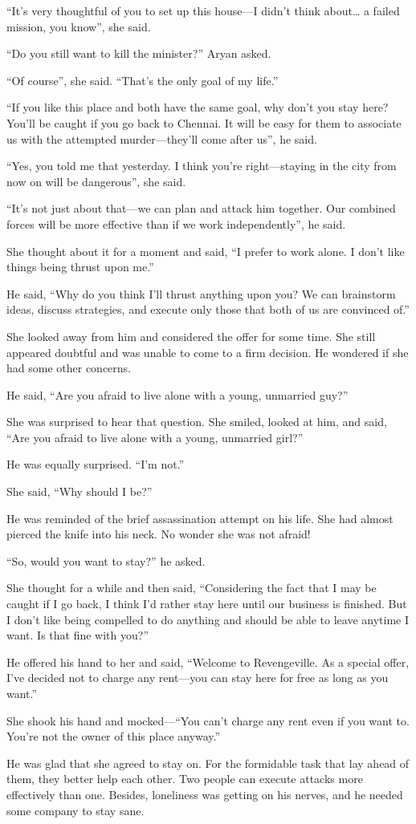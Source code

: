 “It's very thoughtful of you to set up this house—I didn't think about…
a failed mission, you know”, she said.

“Do you still want to kill the minister?” Aryan asked.

“Of course”, she said. “That's the only goal of my life.”

“If you like this place and both have the same goal, why don't you stay
here? You'll be caught if you go back to Chennai. It will be easy for them to
associate us with the attempted murder—they'll come after us”, he said.

“Yes, you told me that yesterday. I think you're right—staying in the city
from now on will be dangerous”, she said.

“It's not just about that—we can plan and attack him together. Our combined
forces will be more effective than if we work independently”, he said.

She thought about it for a moment and said, “I prefer to work alone. I don't
like things being thrust upon me.”

He said, “Why do you think I'll thrust anything upon you? We can brainstorm
ideas, discuss strategies, and execute only those that both of us are convinced
of.”

She looked away from him and considered the offer for some time. She still
appeared doubtful and was unable to come to a firm decision. He wondered if she
had some other concerns.

He said, “Are you afraid to live alone with a young, unmarried guy?”

She was surprised to hear that question. She smiled, looked at him, and said,
“Are you afraid to live alone with a young, unmarried girl?”

He was equally surprised. “I'm not.”

She said, “Why should I be?”

He was reminded of the brief assassination attempt on his life. She had almost
pierced the knife into his neck. No wonder she was not afraid!

“So, would you want to stay?” he asked.

She thought for a while and then said, “Considering the fact that I may be
caught if I go back, I think I'd rather stay here until our business is
finished. But I don't like being compelled to do anything and should be able
to leave anytime I want. Is that fine with you?”

He offered his hand to her and said, “Welcome to Revengeville. As a special
offer, I've decided not to charge any rent—you can stay here for free as
long as you want.”

She shook his hand and mocked—“You can't charge any rent even if you
want to. You're not the owner of this place anyway.”

He was glad that she agreed to stay on. For the formidable task that lay ahead
of them, they better help each other. Two people can execute attacks
more effectively than one. Besides, loneliness was getting on his
nerves, and he needed some company to stay sane.